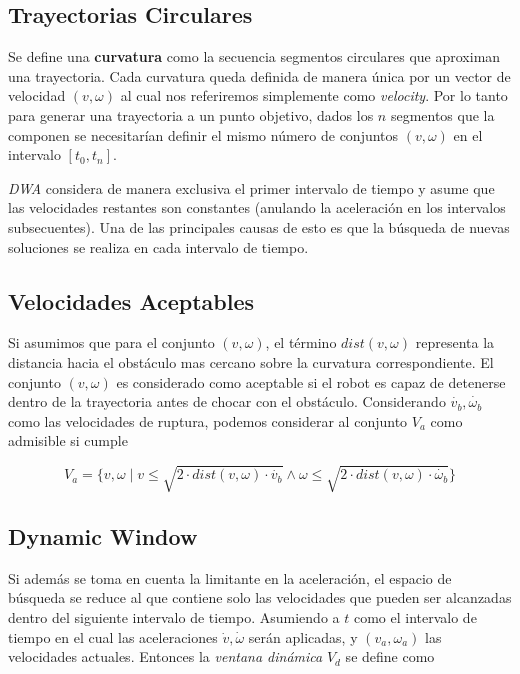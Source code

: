 \documentclass[10pt]{article}
\begin{document}



\subsection{Trayectorias Circulares}

Se define una \textbf{curvatura} como la secuencia segmentos circulares que aproximan una trayectoria. Cada curvatura queda definida de manera única por un vector de velocidad $(v, \omega)$ al cual nos referiremos simplemente como \emph{velocity}. Por lo tanto para generar una trayectoria a un punto objetivo, dados los $n$ segmentos que la componen se necesitarían definir el mismo número de conjuntos $(v, \omega)$ en el intervalo $[t_0, t_n]$.

\emph{DWA} considera de manera exclusiva el primer intervalo de tiempo y asume que las velocidades restantes son constantes (anulando la aceleración en los intervalos subsecuentes). Una de las principales causas de esto es que la búsqueda de nuevas soluciones se realiza en cada intervalo de tiempo.

\subsection{Velocidades Aceptables}

Si asumimos que para el conjunto $(v, \omega)$, el término $dist(v, \omega)$ representa la distancia hacia el obstáculo mas cercano sobre la curvatura correspondiente. El conjunto $(v, \omega)$ es considerado como aceptable si el robot es capaz de detenerse dentro de la trayectoria antes de chocar con el obstáculo. Considerando $\dot{v_b}, \dot{\omega_b}$ como las velocidades de ruptura, podemos considerar al conjunto $V_a$ como admisible si cumple

\begin{equation}
	V_a = \{ 
		v, \omega \mid 
			v \leq \sqrt{2\cdot dist(v,\omega) \cdot \dot{v_b}} 
			\wedge
			\omega \leq \sqrt{2\cdot dist(v,\omega) \cdot \dot{\omega_b}} 
	\}
\end{equation}

\subsection{Dynamic Window}

Si además se toma en cuenta la limitante en la aceleración, el espacio de búsqueda se reduce al que contiene solo las velocidades que pueden ser alcanzadas dentro del siguiente intervalo de tiempo. Asumiendo a $t$ como el intervalo de tiempo en el cual las aceleraciones $\dot{v}, \dot{\omega}$ serán aplicadas, y $(v_a, \omega_a)$ las velocidades actuales. Entonces la \emph{ventana dinámica} $V_d$ se define como
\end{document}
